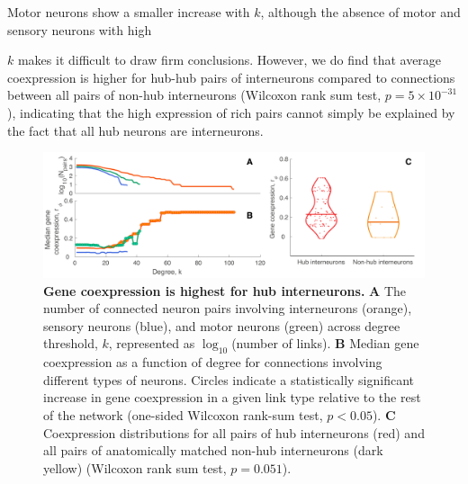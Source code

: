 \documentclass[10pt,letterpaper]{article}
\begin{document}
Motor neurons show a smaller increase with $k$, although the absence of motor and sensory neurons with high {$k$ makes it difficult to draw firm conclusions.
However, we do find that average coexpression is higher for hub-hub pairs of interneurons compared to connections between all pairs of non-hub interneurons (Wilcoxon rank sum test, $p = 5 \times 10^{-31}$), indicating that the high expression of rich pairs cannot simply be explained by the fact that all hub neurons are interneurons.

\begin{figure}[h]
\centering
   \includegraphics[width=1\textwidth]{Type_Degree4.pdf}
 \caption{
\textbf{Gene coexpression is highest for hub interneurons.}
\textbf{A} The number of connected neuron pairs involving interneurons (orange), sensory neurons (blue), and motor neurons (green) across degree threshold, $k$, represented as $\log_{10}$(number of links).
\textbf{B} Median gene coexpression as a function of degree for connections involving different types of neurons.
Circles indicate a statistically significant increase in gene coexpression in a given link type relative to the rest of the network (one-sided Wilcoxon rank-sum test, $p < 0.05$).
\textbf{C} Coexpression distributions for all pairs of hub interneurons (red) and all pairs of anatomically matched non-hub interneurons (dark yellow) (Wilcoxon rank sum test, $p = 0.051$).
}
 \label{fig:interneuron_dep}
\end{figure}

}
\end{document}
